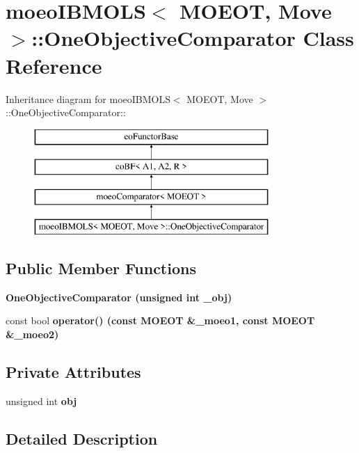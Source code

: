 \section{moeo\-IBMOLS$<$ MOEOT, Move $>$::One\-Objective\-Comparator Class Reference}
\label{classmoeoIBMOLS_1_1OneObjectiveComparator}
Inheritance diagram for moeo\-IBMOLS$<$ MOEOT, Move $>$::One\-Objective\-Comparator::\begin{figure}[H]
\begin{center}
\leavevmode
\includegraphics[height=4cm]{classmoeoIBMOLS_1_1OneObjectiveComparator}
\end{center}
\end{figure}
\subsection*{Public Member Functions}
\begin{CompactItemize}
\item 
\bf{One\-Objective\-Comparator} (unsigned int \_\-obj)\label{classmoeoIBMOLS_1_1OneObjectiveComparator_09ee419d143aa29bb05d48c358655bb1}

\item 
const bool \bf{operator()} (const MOEOT \&\_\-moeo1, const MOEOT \&\_\-moeo2)\label{classmoeoIBMOLS_1_1OneObjectiveComparator_44685d0ab08fede366bb404fe7f36302}

\end{CompactItemize}
\subsection*{Private Attributes}
\begin{CompactItemize}
\item 
unsigned int \bf{obj}\label{classmoeoIBMOLS_1_1OneObjectiveComparator_724ca0379e42fdffe4ec0d788cd52f43}

\end{CompactItemize}


\subsection{Detailed Description}
